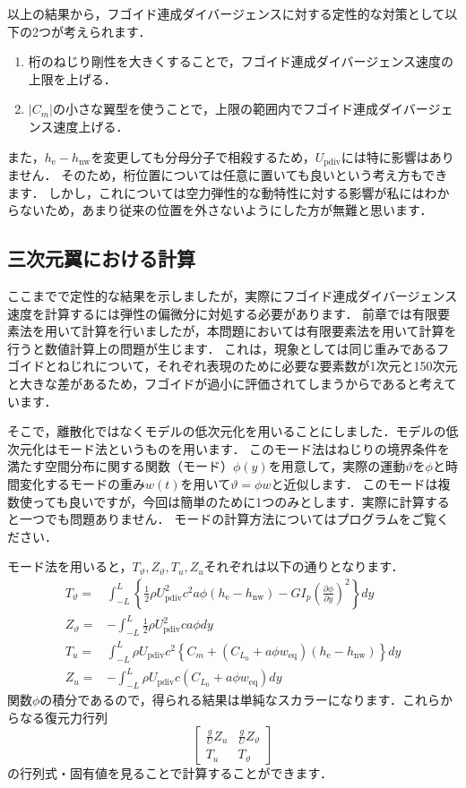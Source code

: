 \documentclass{jarticle}
\begin{document}
以上の結果から，フゴイド連成ダイバージェンスに対する定性的な対策として以下の2つが考えられます．
\begin{enumerate}
    \item 桁のねじり剛性を大きくすることで，フゴイド連成ダイバージェンス速度の上限を上げる．
    \item $|C_m|$の小さな翼型を使うことで，上限の範囲内でフゴイド連成ダイバージェンス速度上げる．
\end{enumerate}
また，$h_\mathrm{e}-h_\mathrm{nw}$を変更しても分母分子で相殺するため，$U_\mathrm{pdiv}$には特に影響はありません．
そのため，桁位置については任意に置いても良いという考え方もできます．
しかし，これについては空力弾性的な動特性に対する影響が私にはわからないため，あまり従来の位置を外さないようにした方が無難と思います．

\subsection{三次元翼における計算}

ここまでで定性的な結果を示しましたが，実際にフゴイド連成ダイバージェンス速度を計算するには弾性の偏微分に対処する必要があります．
前章では有限要素法を用いて計算を行いましたが，本問題においては有限要素法を用いて計算を行うと数値計算上の問題が生じます．
これは，現象としては同じ重みであるフゴイドとねじれについて，それぞれ表現のために必要な要素数が1次元と150次元と大きな差があるため，フゴイドが過小に評価されてしまうからであると考えています．

そこで，離散化ではなくモデルの低次元化を用いることにしました．モデルの低次元化はモード法というものを用います．
このモード法はねじりの境界条件を満たす空間分布に関する関数（モード）$\phi(y)$を用意して，実際の運動$\vartheta$を$\phi$と時間変化するモードの重み$w(t)$を用いて$\vartheta=\phi w$と近似します．
このモードは複数使っても良いですが，今回は簡単のために1つのみとします．実際に計算すると一つでも問題ありません．
モードの計算方法についてはプログラムをご覧ください．

モード法を用いると，$T_\vartheta,Z_\vartheta,T_u,Z_u$それぞれは以下の通りとなります．
\begin{align}
    T_\vartheta =& \int_{-L}^{L} \left\{ \frac{1}{2}\rho U_\mathrm{pdiv}^2 c^2 a \phi  (h_\mathrm{e}-h_\mathrm{nw}) - GI_p\left( \frac{\partial \phi}{\partial y} \right)^2 \right\} dy \\
    Z_\vartheta =& -\int_{-L}^L \frac{1}{2}\rho U_\mathrm{pdiv}^2 c a \phi dy \\
    T_u =& \int_{-L}^L \rho U_\mathrm{pdiv} c^2 \left\{ C_m +  (C_{L_0} + a\phi w_\mathrm{eq})  (h_\mathrm{e}-h_\mathrm{nw}) \right\} dy \\
    Z_u =& -\int_{-L}^L \rho U_\mathrm{pdiv} c (C_{L_0} + a\phi w_\mathrm{eq}) dy
\end{align}
関数$\phi$の積分であるので，得られる結果は単純なスカラーになります．これらからなる復元力行列
\begin{equation}
    \begin{bmatrix}
        \frac{g}{U}Z_u & \frac{g}{U}Z_\vartheta \\
        T_u & T_\vartheta
    \end{bmatrix}
\end{equation}
の行列式・固有値を見ることで計算することができます．
\end{document}
